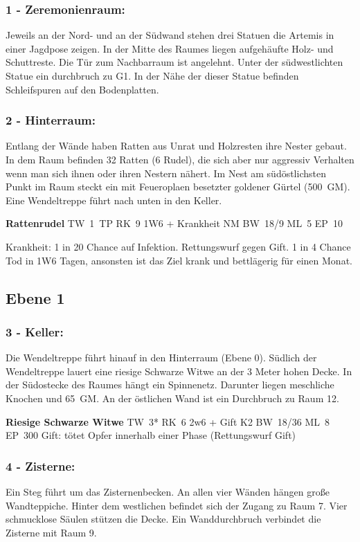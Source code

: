\subsubsection{1 - Zeremonienraum:} Jeweils an der Nord- und an der Südwand stehen drei
Statuen die Artemis in einer Jagdpose zeigen. In der Mitte des Raumes
liegen aufgehäufte Holz- und Schuttreste. Die Tür zum Nachbarraum ist
angelehnt. Unter der südwestlichten Statue ein durchbruch zu G1. In
der Nähe der dieser Statue befinden Schleifspuren auf den Bodenplatten.

\subsubsection{2 - Hinterraum:} Entlang der Wände haben Ratten aus Unrat und Holzresten
ihre Nester gebaut. In dem Raum befinden 32 Ratten (6 Rudel), die sich
aber nur aggressiv Verhalten wenn man sich ihnen oder ihren Nestern
nähert. Im Nest am südöstlichsten Punkt im Raum steckt ein mit
Feueroplaen besetzter goldener Gürtel (500~GM). Eine Wendeltreppe führt
nach unten in den Keller.

\textbf{Rattenrudel} TW~1~TP RK~9 1W6 + Krankheit NM
BW~18/9 ML~5 EP~10

Krankheit: 1 in 20 Chance auf Infektion. Rettungswurf
gegen Gift. 1 in 4 Chance Tod in 1W6 Tagen, ansonsten ist das Ziel krank
und bettlägerig für einen Monat.

\subsection{Ebene 1}

\subsubsection{3 - Keller:} Die Wendeltreppe führt hinauf in den Hinterraum (Ebene
0). Südlich der Wendeltreppe lauert eine riesige Schwarze Witwe an
der 3 Meter hohen Decke.  In der Südostecke des Raumes hängt ein
Spinnenetz. Darunter liegen meschliche Knochen und 65~GM. An der östlichen
Wand ist ein Durchbruch zu Raum 12.

\textbf{Riesige Schwarze Witwe} TW~3* RK~6 2w6 + Gift K2 BW~18/36 ML~8 EP~300
Gift: tötet Opfer innerhalb einer Phase (Rettungswurf Gift)

\subsubsection{4 - Zisterne:} Ein Steg führt um das Zisternenbecken. An allen vier
Wänden hängen große Wandteppiche. Hinter dem westlichen befindet sich
der Zugang zu Raum 7. Vier schmucklose Säulen stützen die Decke. Ein
Wanddurchbruch verbindet die Zisterne mit Raum 9.

